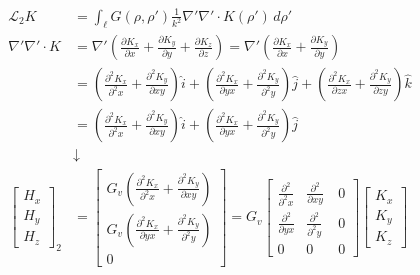 \documentclass{article}
\newcommand{\0}{\varnothing}
\begin{document}
\begin{align*}
    \\
    \mathcal{L}_2 K &= \int_{\ell}G(\rho,\rho')\frac{1}{k^2}\nabla'\nabla'\cdotp K(\rho') \,d\rho'\\
    \nabla'\nabla'\cdotp K &= \nabla' (\frac{\partial K_x}{\partial x} + \frac{\partial K_y}{\partial y} + \frac{\partial K_z}{\partial z}) 
    = \nabla' \left( \frac{\partial K_x}{\partial x} + \frac{\partial K_y}{\partial y} \right)\\
    &= \left( \frac{\partial^2 K_x}{\partial^2 x} + \frac{\partial^2 K_y}{\partial xy}\right) \hat i + 
    \left( \frac{\partial^2 K_x}{\partial yx} + \frac{\partial^2 K_y}{\partial^2 y}\right) \hat j + 
        \left( \frac{\partial^2 K_x}{\partial zx} + \frac{\partial^2 K_y}{\partial zy}\right) \hat k\\
	&=  \left( \frac{\partial^2 K_x}{\partial^2 x} + \frac{\partial^2 K_y}{\partial xy}\right) \hat i + 
    \left( \frac{\partial^2 K_x}{\partial yx} + \frac{\partial^2 K_y}{\partial^2 y}\right) \hat j \\
    &\downarrow \\
    \left[ \begin{array}{c} H_x \\ H_y \\ H_z \end{array} \right]_2 &= 
    \left[ \begin{array}{c} G_v\left( \frac{\partial^2 K_x}{\partial^2 x} + \frac{\partial^2 K_y}{\partial xy}\right) \\ 
                            G_v\left( \frac{\partial^2 K_x}{\partial yx} + \frac{\partial^2 K_y}{\partial^2 y}\right)\\ 
                            0 \end{array} \right] = 
    G_v \left[ \begin{array}{ccc} \frac{\partial^2 }{\partial^2 x} & \frac{\partial^2 }{\partial xy}\ & 0 \\ 
                            \frac{\partial^2 }{\partial yx} & \frac{\partial^2 }{\partial^2 y} &0\\ 
                            0 & 0 &0 \end{array} \right]
		\left[ \begin{array}{c} K_x \\ K_y \\ K_z \end{array} \right]\\
\end{align*}
\end{document}
